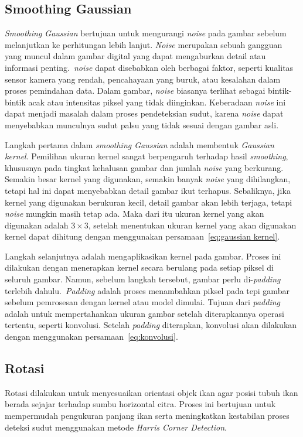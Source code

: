 \subsection{Smoothing Gaussian}
   \emph{Smoothing Gaussian} bertujuan untuk mengurangi \emph{noise} pada gambar sebelum melanjutkan ke perhitungan lebih lanjut.
\emph{Noise} merupakan sebuah gangguan yang muncul dalam gambar digital yang dapat mengaburkan detail atau informasi penting.~\emph{noise} dapat disebabkan oleh berbagai faktor, seperti kualitas sensor kamera yang rendah, pencahayaan yang buruk, atau kesalahan dalam proses pemindahan data.
Dalam gambar, \emph{noise} biasanya terlihat sebagai bintik-bintik acak atau intensitas piksel yang tidak diinginkan. Keberadaan \emph{noise} ini dapat menjadi masalah dalam proses pendeteksian sudut, karena \emph{noise} dapat menyebabkan munculnya sudut palsu yang tidak sesuai dengan gambar asli.
    
    Langkah pertama dalam \emph{smoothing Gaussian} adalah membentuk \emph{Gaussian kernel}. Pemilihan ukuran kernel sangat berpengaruh terhadap hasil \emph{smoothing}, khususnya pada tingkat kehalusan gambar dan jumlah \emph{noise} yang berkurang.
Semakin besar kernel yang digunakan, semakin banyak \emph{noise} yang dihilangkan, tetapi hal ini dapat menyebabkan detail gambar ikut terhapus. Sebaliknya, jika kernel yang digunakan berukuran kecil, detail gambar akan lebih terjaga, tetapi \emph{noise} mungkin masih tetap ada.
Maka dari itu ukuran kernel yang akan digunakan adalah \(3 \times 3\), setelah menentukan ukuran kernel yang akan digunakan kernel dapat dihitung dengan menggunakan persamaan~\eqref{eq:gaussian kernel}.

    Langkah selanjutnya adalah mengaplikasikan kernel pada gambar. Proses ini dilakukan dengan menerapkan kernel secara berulang pada setiap piksel di seluruh gambar.
Namun, sebelum langkah tersebut, gambar perlu di-\emph{padding} terlebih dahulu.~\emph{Padding} adalah proses menambahkan piksel pada tepi gambar sebelum pemrosesan dengan kernel atau model dimulai.
Tujuan dari \emph{padding} adalah untuk mempertahankan ukuran gambar setelah diterapkannya operasi tertentu, seperti konvolusi. 
Setelah \emph{padding} diterapkan, konvolusi akan dilakukan dengan menggunakan persamaan~\eqref{eq:konvolusi}. 

\subsection{Rotasi}
    Rotasi dilakukan untuk menyesuaikan orientasi objek ikan agar posisi tubuh ikan berada sejajar terhadap sumbu horizontal citra. Proses ini bertujuan untuk mempermudah pengukuran panjang ikan serta meningkatkan kestabilan proses deteksi sudut menggunakan metode \emph{Harris Corner Detection}. 
    
